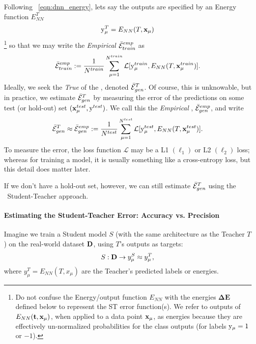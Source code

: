 Following \EQN~\ref{eqn:dnn_energy}, lets say the \Teacher outputs are specified
by an  Energy function $E^{T}_{NN}$
\begin{align}
\label{eqn:T_ENN}
\mathrm{y}_{\mu}^{T}=E_{NN}(T,\mathbf{x}_{\mu}) 
\end{align}
\footnote{Do not confuse the Energy/output function $E_{NN}$ with the energies $\mathbf{\Delta E}$  defined below to represent the ST error function(s).  We refer to outputs of $E_{NN}({\mathbf{t}},\mathbf{x}_{\mu} )$, when applied to a data point $\mathbf{x}_{\mu}$, as energies because they are effectively un-normalized probabilities for the class outputs (for labels $\mathrm{y}_{\mu}=1$ or $-1$).  }
so that we may write the \emph{Empirical} \AverageTrainingError
$\bar{\mathcal{E}}^{emp}_{train}$
as 
\begin{align}
\label{eqn:Eg_train}
\bar{\mathcal{E}}^{emp}_{train}:= \frac{1}{N^{train}}\sum_{\mu=1}^{N^{train}}\mathcal{L}[\mathrm{y}_{\mu}^{train},E_{NN}(T,\mathbf{x}_{\mu}^{train})]  .
\end{align}
Ideally, we seek the \emph{True} \AverageGeneralizationError of the \Teacher, denoted  $\bar{\mathcal{E}}_{gen}^{T}$. 
Of course, this is unknowable, but in practice, we estimate $\bar{\mathcal{E}}_{gen}^{T}$ 
by measuring the error of the \Teacher predictions on some test (or hold-out) set $(\mathbf{x}_{\mu}^{test}, \mathrm{y}^{test})$.
We call this the \emph{Empirical \AverageGeneralizationError}, $\bar{\mathcal{E}}^{emp}_{gen}$, and write
\begin{align}
\label{eqn:Eg_test}
 \bar{\mathcal{E}}_{gen}^{T}\approx \bar{\mathcal{E}}^{emp}_{gen}:= \frac{1}{N^{test}}\sum_{\mu=1}^{N^{test}}\mathcal{L}[\mathrm{y}_{\mu}^{test},E_{NN}(T,\mathbf{x}_{\mu}^{test})] .
\end{align}
To measure the error, the loss function $\mathcal{L}$ may be a L1 $(\ell_1)$ or L2 $(\ell_2)$ loss;
whereas for training a model, it is usually something like a cross-entropy loss, but this detail does matter later.

If we don't have a hold-out set, however, we can still estimate $\bar{\mathcal{E}}_{gen}^{T}$ using the \ Student-Teacher approach.

\paragraph{Estimating the Student-Teacher Error: Accuracy vs. Precision}
Imagine we train a Student model $S$ (with the same architecture as the Teacher $T$) on the real-world dataset $\mathbf{D}$, using $T$'s outputs as targets:
\begin{equation*}
S: \mathbf{D} \to y^{S}_\mu \approx y^{T}_\mu,
\label{eqn:S_ENN}
\end{equation*}
where $y^T_\mu = E_{NN}(T, x_\mu)$ are the Teacher’s predicted labels or energies.

